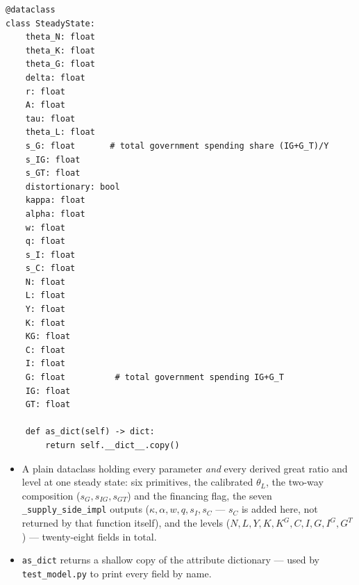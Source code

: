 \documentclass[11pt]{article}
\begin{document}
\begin{lstlisting}[firstnumber=108]
@dataclass
class SteadyState:
    theta_N: float
    theta_K: float
    theta_G: float
    delta: float
    r: float
    A: float
    tau: float
    theta_L: float
    s_G: float       # total government spending share (IG+G_T)/Y
    s_IG: float
    s_GT: float
    distortionary: bool
    kappa: float
    alpha: float
    w: float
    q: float
    s_I: float
    s_C: float
    N: float
    L: float
    Y: float
    K: float
    KG: float
    C: float
    I: float
    G: float          # total government spending IG+G_T
    IG: float
    GT: float

    def as_dict(self) -> dict:
        return self.__dict__.copy()
\end{lstlisting}
\begin{itemize}
\item[\textbf{L108--L139}] A plain dataclass holding every parameter
\emph{and} every derived great ratio and level at one steady state: six
primitives, the calibrated $\theta_L$, the two-way composition
($s_G,s_{IG},s_{GT}$) and the financing flag, the seven
\texttt{\_supply\_side\_impl} outputs ($\kappa,\alpha,w,q,s_I,s_C$ --- $s_C$
is added here, not returned by that function itself), and the levels
($N,L,Y,K,K^G,C,I,G,I^G,G^T$) --- twenty-eight fields in total.
\item[\textbf{L139--L140}] \texttt{as\_dict} returns a shallow copy of the
attribute dictionary --- used by \texttt{test\_model.py} to print every
field by name.
\end{itemize}
\end{document}
